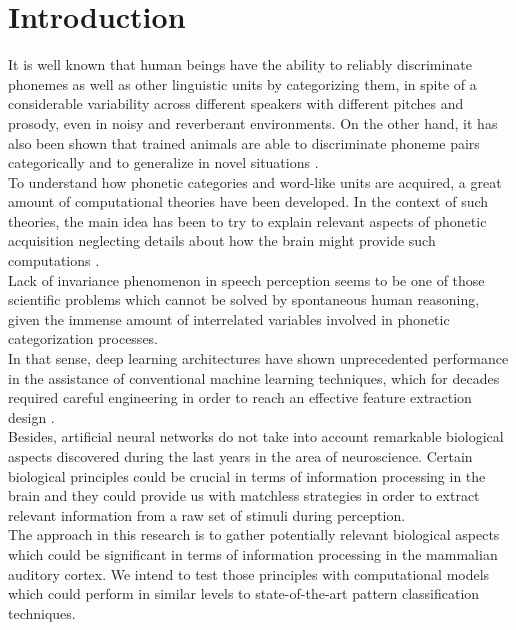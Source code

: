 \documentclass[11pt,a4paper]{article}
\begin{document}
\section{Introduction}

It is well known that human beings have the ability to reliably discriminate phonemes
as well as other linguistic units by categorizing them,
in spite of a considerable variability across different speakers
with different pitches and prosody, even in noisy and reverberant
environments.
On the other hand, it has also been shown that trained animals
are able to discriminate phoneme
pairs categorically and to generalize in novel situations
\cite{kuhl_1975, kuhl_1983, kluender_1998, pons_2006, hienz_1996, dent_1997, lotto_1997}. \\

To understand how phonetic categories and word-like units
are acquired, a great amount of computational theories have been developed.
In the context of such theories, the main idea has
been to try to explain relevant aspects of phonetic acquisition neglecting details
about how the brain might provide such
computations \cite{rasanen_2012}. \\

Lack of invariance phenomenon in speech perception
\cite{appelbaum_1996}
seems to be one of those scientific problems which
cannot be solved by spontaneous human reasoning,
given the immense amount of interrelated variables
involved in phonetic categorization processes. \\

In that sense, deep learning architectures have shown
unprecedented performance in the assistance of
conventional machine learning techniques, which for decades 
required careful engineering
in order to reach an effective feature extraction design
\cite{lecun_2015}. \\

Besides, artificial neural networks do not take into account
remarkable biological aspects discovered during the last years
in the area of neuroscience.
Certain biological principles could be crucial in terms of
information processing in the brain and they could
provide us with matchless strategies in order to extract
relevant information from a raw set of stimuli
during perception. \\

The approach in this research is to gather
potentially relevant biological aspects which could be
significant in terms of information processing
in the mammalian auditory cortex. We intend to test those principles
with computational models which could
perform in similar levels to state-of-the-art pattern classification techniques. \\
\end{document}

